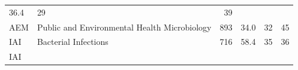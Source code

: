\documentclass[11pt,]{article}
\begin{document}
\begin{longtable}[]{@{}llrrrr@{}}
\begin{minipage}[t]{0.08\columnwidth}
36.4\strut
\end{minipage} & \begin{minipage}[t]{0.11\columnwidth}\raggedleft\strut
29\strut
\end{minipage} & \begin{minipage}[t]{0.11\columnwidth}\raggedleft\strut
39\strut
\end{minipage}\tabularnewline
\begin{minipage}[t]{0.06\columnwidth}\raggedright\strut
AEM\strut
\end{minipage} & \begin{minipage}[t]{0.43\columnwidth}\raggedright\strut
Public and Environmental Health Microbiology\strut
\end{minipage} & \begin{minipage}[t]{0.04\columnwidth}\raggedleft\strut
893\strut
\end{minipage} & \begin{minipage}[t]{0.08\columnwidth}\raggedleft\strut
34.0\strut
\end{minipage} & \begin{minipage}[t]{0.11\columnwidth}\raggedleft\strut
32\strut
\end{minipage} & \begin{minipage}[t]{0.11\columnwidth}\raggedleft\strut
45\strut
\end{minipage}\tabularnewline
\begin{minipage}[t]{0.06\columnwidth}\raggedright\strut
IAI\strut
\end{minipage} & \begin{minipage}[t]{0.43\columnwidth}\raggedright\strut
Bacterial Infections\strut
\end{minipage} & \begin{minipage}[t]{0.04\columnwidth}\raggedleft\strut
716\strut
\end{minipage} & \begin{minipage}[t]{0.08\columnwidth}\raggedleft\strut
58.4\strut
\end{minipage} & \begin{minipage}[t]{0.11\columnwidth}\raggedleft\strut
35\strut
\end{minipage} & \begin{minipage}[t]{0.11\columnwidth}\raggedleft\strut
36\strut
\end{minipage}\tabularnewline
\begin{minipage}[t]{0.06\columnwidth}\raggedright\strut
IAI\strut
\end{minipage} & \begin{minipage}[t]{0.43\columnwidth}\raggedright\strut

\end{minipage}
\end{longtable}
\end{document}
